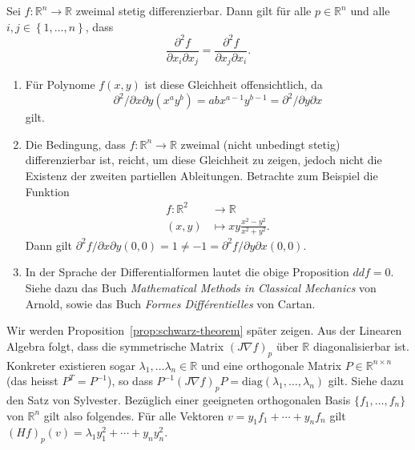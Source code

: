 \documentclass[../main.tex]{subfiles}
\begin{document}
\begin{proposition}\label{prop:schwarz-theorem}
  Sei $f \colon \mathbb{R}^n \to \mathbb{R}$ zweimal stetig differenzierbar.
  Dann gilt für alle $p \in \mathbb{R}^n$ 
  und alle $i, j \in \left\{1, \dots, n \right\}$, dass
  \[
    \frac{\partial^2 f}{\partial x_i \partial x_j}
    =
    \frac{\partial^2 f}{\partial x_j \partial x_i}.
  \]
\end{proposition}

\begin{remark}
  \leavevmode
  \begin{enumerate}[(1)]
    \item Für Polynome $f(x, y)$ ist diese Gleichheit offensichtlich,
      da 
      \[
      \partial^2 / \partial x \partial y (x^a y^b) = ab x^{a-1} y^{b-1}
      = \partial^2 / \partial y \partial x
      \]
      gilt.
    \item
      Die Bedingung, dass $f \colon \mathbb{R}^n \to \mathbb{R}$
      zweimal (nicht unbedingt stetig) differenzierbar ist,
      reicht, um diese Gleichheit zu zeigen, jedoch nicht
      die Existenz der zweiten partiellen Ableitungen.
      Betrachte zum Beispiel die Funktion
      \begin{align*}
        f \colon \mathbb{R}^2 & \to \mathbb{R} \\
        (x, y) & \mapsto xy \frac{x^2 - y^2}{x^2 + y^2}.
      \end{align*}
      Dann gilt $\partial^2 f/ \partial x \partial y (0, 0) = 1
      \neq -1 = \partial^2 f / \partial y \partial x (0, 0)$.
    \item In der Sprache der Differentialformen
      lautet die obige Proposition $ddf = 0$.
      Siehe dazu das Buch \emph{Mathematical Methods in Classical
      Mechanics} von Arnold,
      sowie das Buch \emph{Formes Différentielles} von Cartan.
  \end{enumerate}
  
\end{remark}

Wir werden Proposition~\ref{prop:schwarz-theorem} später zeigen.
Aus der Linearen Algebra folgt, dass
die symmetrische Matrix ${(J \nabla f)}_p$ über $\mathbb{R}$ 
diagonalisierbar ist.
Konkreter existieren sogar
$\lambda_1, \dots \lambda_n \in \mathbb{R}$ und
eine orthogonale Matrix $P \in \mathbb{R}^{n \times n}$ 
(das heisst $P^T = P^{-1}$), so dass
$P^{-1} {(J \nabla f)}_p P = \text{diag}(\lambda_1, \dots, \lambda_n)$ 
gilt. Siehe dazu den Satz von Sylvester.
Bezüglich einer geeigneten orthogonalen Basis
$\{f_1, \dots, f_n \}$ von $\mathbb{R}^n$ 
gilt also folgendes. Für alle
Vektoren
$v = y_1 f_1 + \cdots + y_n f_n$ gilt
${(Hf)}_p(v) = \lambda_1 y_1^2 + \cdots + y_n y_n^2$.
\end{document}
